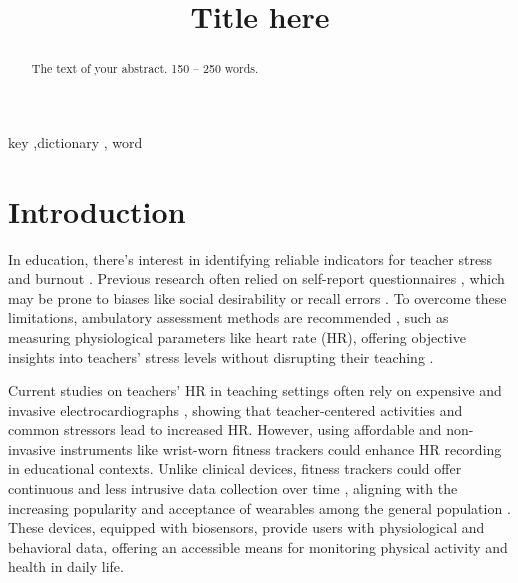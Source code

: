 \documentclass[]{elsarticle} %
\begin{document}
\begin{frontmatter}

  \title{Title here}
  
  \begin{abstract}
  The text of your abstract. 150 -- 250 words.
  \end{abstract}
    \begin{keyword}
    key \sep dictionary \sep 
    word
  \end{keyword}
  
 \end{frontmatter}

\hypertarget{introduction}{%
\section{Introduction}\label{introduction}}

In education, there's interest in identifying reliable indicators for
teacher stress and burnout \citep{fisher2011, junker2021}. Previous
research often relied on self-report questionnaires
\citep{chaplain2008, liu2020}, which may be prone to biases like social
desirability \citep{razavi2001self} or recall errors
\citep{van2016accuracy}. To overcome these limitations, ambulatory
assessment methods are recommended
\citep{trull2013ambulatory, wettstein2020ambulatory}, such as measuring
physiological parameters like heart rate (HR), offering objective
insights into teachers' stress levels without disrupting their teaching
\citep{donker2018, runge2020}.

Current studies on teachers' HR in teaching settings often rely on
expensive and invasive electrocardiographs
\citep{sperka1995, scheuch1997psychophysische, donker2018, junker2021, huang2022class},
showing that teacher-centered activities and common stressors lead to
increased HR. However, using affordable and non-invasive instruments
like wrist-worn fitness trackers \citep{ferguson2015} could enhance HR
recording in educational contexts. Unlike clinical devices, fitness
trackers could offer continuous and less intrusive data collection over
time \citep{godfrey2018z}, aligning with the increasing popularity and
acceptance of wearables among the general population
\citep{peng2022acceptance}. These devices, equipped with biosensors,
provide users with physiological and behavioral data, offering an
accessible means for monitoring physical activity and health in daily
life.
\end{document}
